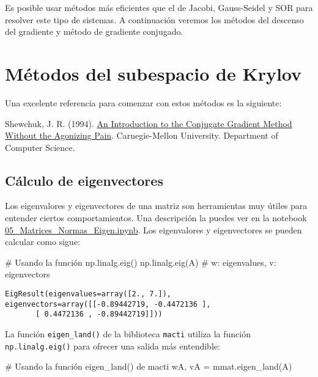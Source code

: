 \documentclass[
  letterpaper,
  DIV=11,
  numbers=noendperiod]{scrreprt}
\newenvironment{Shaded}{\begin{snugshade}}{\end{snugshade}}
\newcommand{\CommentTok}[1]{\textcolor[rgb]{0.37,0.37,0.37}{#1}}
\newcommand{\NormalTok}[1]{\textcolor[rgb]{0.00,0.23,0.31}{#1}}
\newcommand{\OperatorTok}[1]{\textcolor[rgb]{0.37,0.37,0.37}{#1}}
\begin{document}
Es posible usar métodos más eficientes que el de Jacobi, Gauss-Seidel y
SOR para resolver este tipo de sistemas. A continuación veremos los
métodos del descenso del gradiente y método de gradiente conjugado.


\chapter{Métodos del subespacio de
Krylov}\label{muxe9todos-del-subespacio-de-krylov}

Una excelente referencia para comenzar con estos métodos es la
siguiente:

Shewchuk, J. R. (1994).
\href{https://www.cs.cmu.edu/~quake-papers/painless-conjugate-gradient.pdf}{An
Introduction to the Conjugate Gradient Method Without the Agonizing
Pain}. Carnegie-Mellon University. Department of Computer Science.

\section{Cálculo de eigenvectores}\label{cuxe1lculo-de-eigenvectores}

Los eigenvalores y eigenvectores de una matriz son herramientas muy
útiles para entender ciertos comportamientos. Una descripción la puedes
ver en la notebook \url{05_Matrices_Normas_Eigen.ipynb}. Los
eigenvalores y eigenvectores se pueden calcular como sigue:

\begin{Shaded}
\begin{Highlighting}[]
\CommentTok{\# Usando la función np.linalg.eig()}
\NormalTok{np.linalg.eig(A)  }\CommentTok{\# w: eigenvalues, v: eigenvectors}
\end{Highlighting}
\end{Shaded}

\begin{verbatim}
EigResult(eigenvalues=array([2., 7.]), eigenvectors=array([[-0.89442719, -0.4472136 ],
       [ 0.4472136 , -0.89442719]]))
\end{verbatim}

La función \texttt{eigen\_land()} de la biblioteca \texttt{macti}
utiliza la función \texttt{np.linalg.eig()} para ofrecer una salida más
entendible:

\begin{Shaded}
\begin{Highlighting}[]
\CommentTok{\# Usando la función eigen\_land() de macti}
\NormalTok{wA, vA }\OperatorTok{=}\NormalTok{ mmat.eigen\_land(A)}
\end{Highlighting}
\end{Shaded}
\end{document}
